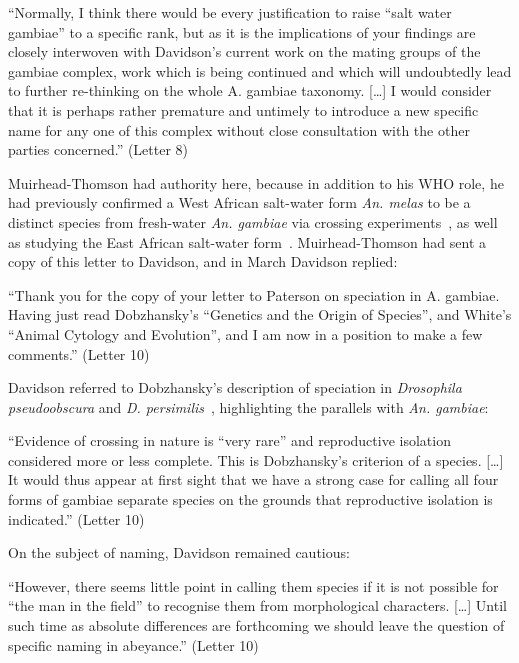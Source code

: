 \documentclass[a4paper,11pt,abstracton,hidelinks]{scrartcl}
\begin{document}
\begin{displayquote}
``Normally, I think there would be every justification to raise ``salt water gambiae'' to a specific rank, but as it is the implications of your findings are closely interwoven with Davidson's current work on the mating groups of the gambiae complex, work which is being continued and which will undoubtedly lead to further re-thinking on the whole A. gambiae taxonomy. [\ldots] I would consider that it is perhaps rather premature and untimely to introduce a new specific name for any one of this complex without close consultation with the other parties concerned.'' (Letter 8)
\end{displayquote}


Muirhead-Thomson had authority here, because in addition to his WHO role, he had previously confirmed a West African salt-water form \textit{An. melas} to be a distinct species from fresh-water \textit{An. gambiae} via crossing experiments~\parencite{MuirheadThomson1948}, as well as studying the East African salt-water form~\parencite{MuirheadThomson1951}.
%
Muirhead-Thomson had sent a copy of this letter to Davidson, and in March Davidson replied:


\begin{displayquote}
``Thank you for the copy of your letter to Paterson on speciation in A. gambiae. Having just read Dobzhansky's ``Genetics and the Origin of Species'', and White's ``Animal Cytology and Evolution'', and I am now in a position to make a few comments.'' (Letter 10)
\end{displayquote}

Davidson referred to Dobzhansky's description of speciation in \textit{Drosophila pseudoobscura} and \textit{D. persimilis}~\parencite{Dobzhansky1951}, highlighting the parallels with \textit{An. gambiae}:


\begin{displayquote}
``Evidence of crossing in nature is ``very rare'' and reproductive isolation considered more or less complete. This is Dobzhansky's criterion of a species. [\ldots] It would thus appear at first sight that we have a strong case for calling all four forms of gambiae separate species on the grounds that reproductive isolation is indicated.'' (Letter 10)
\end{displayquote}


On the subject of naming, Davidson remained cautious:


\begin{displayquote}
``However, there seems little point in calling them species if it is not possible for ``the man in the field'' to recognise them from morphological characters. [\ldots] Until such time as absolute differences are forthcoming we should leave the question of specific naming in abeyance.'' (Letter 10)
\end{displayquote}
\end{document}
